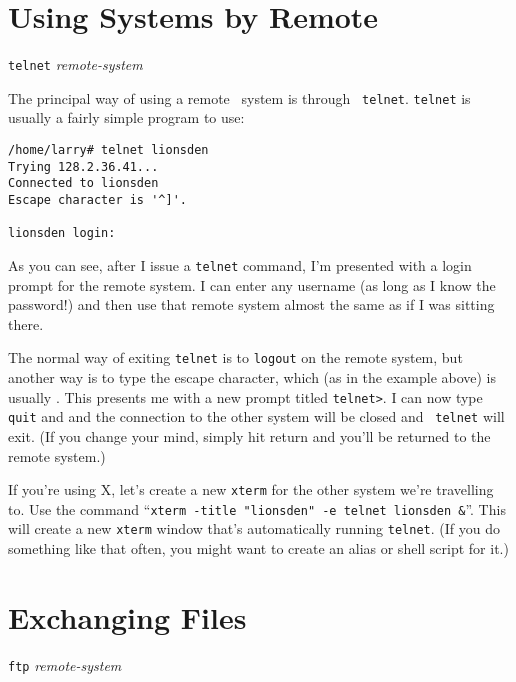 \section{Using Systems by Remote}


\begin{command}
  {\tt telnet} {\sl remote-system}
\end{command}

The principal way of using a remote \unix\ system is through {\tt
  telnet}.  {\tt telnet} is usually a fairly simple program to use:

\begin{screen}\begin{verbatim}
/home/larry# telnet lionsden
Trying 128.2.36.41...
Connected to lionsden
Escape character is '^]'.

lionsden login: 
\end{verbatim}\end{screen}
  
As you can see, after I issue a {\tt telnet} command, I'm presented
with a login prompt for the remote system.  I can enter any username
(as long as I know the password!) and then use that remote system
almost the same as if I was sitting there.

The normal way of exiting {\tt telnet} is to {\tt logout} on the
remote system, but another way is to type the escape character, which
(as in the example above) is usually \key{Ctrl-]}.  This presents me
with a new prompt titled {\tt telnet>}.  I can now type {\tt quit} and
\ret and the connection to the other system will be closed and {\tt
  telnet} will exit.  (If you change your mind, simply hit return and
you'll be returned to the remote system.)

\xwarn If you're using X, let's create a new {\tt xterm} for the other
system we're travelling to. Use the command ``{\tt xterm -title
  "lionsden" -e telnet lionsden \&}''. This will create
a new {\tt xterm} window that's automatically running {\tt telnet}.
(If you do something like that often, you might want to create an
alias or shell script for it.)

\section{Exchanging Files}


\begin{command}
  {\tt ftp} {\sl remote-system}
\end{command}

